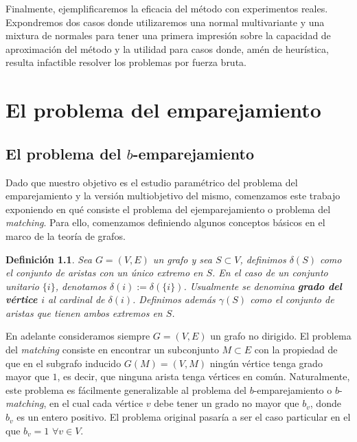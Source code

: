 \documentclass[twoside,a4paper,openright,12pt]{book}
\newtheorem{defi}{Definici\'on}[section]
\begin{document}
Finalmente, ejemplificaremos la eficacia del método con experimentos reales. Expondremos dos casos donde utilizaremos una normal multivariante y una mixtura de normales para tener una primera impresión sobre la capacidad de aproximación del método y la utilidad para casos donde, amén de heurística, resulta infactible resolver los problemas por fuerza bruta.


\newpage
\thispagestyle{empty}
\chapter{El problema del emparejamiento}
\section{El problema del $b$-emparejamiento}
Dado que nuestro objetivo es el estudio paramétrico del problema del emparejamiento y la versión multiobjetivo del mismo, comenzamos este trabajo exponiendo en qué consiste el problema del ejemparejamiento o problema del \textit{matching}. Para ello, comenzamos definiendo algunos conceptos básicos en el marco de la teoría de grafos.
\begin{defi}
Sea $G=(V,E)$ un grafo y sea $S \subset V$, definimos $\delta(S)$ como el conjunto de aristas con un único extremo en $S$. En el caso de un conjunto unitario $\{i\}$, denotamos $\delta(i):=\delta(\{i\})$. Usualmente se denomina \textbf{grado del vértice $i$} al cardinal de $\delta(i)$. Definimos además $\gamma(S)$ como el conjunto de aristas que tienen ambos extremos en $S$.
\end{defi}

En adelante consideramos siempre $G=(V,E)$ un grafo no dirigido. El problema del \textit{matching} consiste en encontrar un subconjunto $M\subset E$ con la propiedad de que en el subgrafo inducido $G(M)=(V,M)$ ningún vértice tenga grado mayor que $1$, es decir, que ninguna arista tenga vértices en común. Naturalmente, este problema es fácilmente generalizable al problema del $b$-emparejamiento o $b$-\textit{matching}, en el cual cada vértice $v$ debe tener un grado no mayor que $b_v$, donde $b_v$ es un entero positivo. El problema original pasaría a ser el caso particular en el que $b_v = 1$ $\forall v \in V$.
\end{document}
